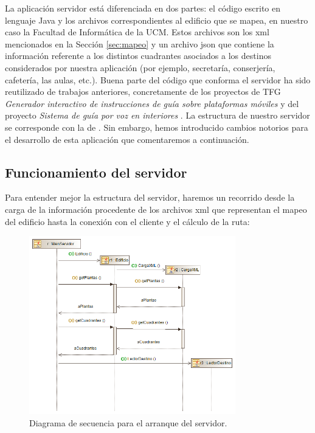La aplicación servidor está diferenciada en dos partes: el código escrito en lenguaje Java y los archivos correspondientes al edificio que se mapea, en nuestro caso la Facultad de Informática de la UCM. Estos archivos son los xml mencionados en la Sección \ref{sec:mapeo} y un archivo json que contiene la información referente a los distintos cuadrantes asociados a los destinos considerados por nuestra aplicación (por ejemplo, secretaría, conserjería, cafetería, las aulas,  etc.). 
Buena parte del código que conforma el servidor ha sido reutilizado de trabajos anteriores, concretamente de los proyectos de TFG \textit{Generador interactivo de instrucciones de guía sobre plataformas móviles} \citep{TFGguia} y del proyecto \textit{Sistema de guía por voz en interiores} \citep{TFGMariana}. La estructura de nuestro servidor se corresponde con la de \cite{TFGguia}. Sin embargo, hemos introducido cambios notorios para el desarrollo de esta aplicación que comentaremos a continuación.

\subsection{Funcionamiento del servidor}
\label{sub:func_servidor}

Para entender mejor la estructura del servidor, haremos un recorrido desde la carga de la información procedente de los archivos xml que representan el mapeo del edificio hasta la conexión con el cliente y el cálculo de la ruta: 


\begin{figure}[t]
	\centering
	\includegraphics[width=0.8\textwidth]{Imagenes/Capitulo4/diagramasUML/arranqueServidor}
	\caption{Diagrama de secuencia para el arranque del servidor.}
	\label{fig:diag_sec_arranqueServ}
\end{figure}



